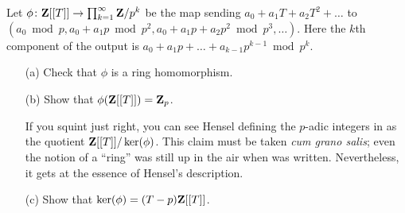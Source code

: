 

\begin{challenge} Let $\phi\colon \mathbf{Z}[[T]] \to \prod_{k=1}^{\infty} \mathbf{Z}/p^k$ be the map sending $a_0 + a_1 T + a_2 T^2 + \dots$ to $(a_0 \bmod{p}, a_0 + a_1 p \bmod{p^2}, a_0 + a_1 p + a_2 p^2 \bmod{p^3}, \dots)$. Here the $k$th component of the output is  $a_0 + a_1 p + \dots + a_{k-1} p^{k-1}\bmod p^k$. 
\vspace{-0.12in}
\begin{enumerate} 
    \item[(a)] Check that $\phi$ is a ring homomorphism.
    \item[(b)] Show that $\phi(\mathbf{Z}[[T]]) = \mathbf{Z}_p$. 

{\scriptsize If you squint just right, 
you can see Hensel defining the $p$-adic integers in \cite{hensel13} as the quotient $\mathbf{Z}[[T]]/\ker(\phi)$. This claim must be taken \textsl{cum grano salis}; even the notion of a ``ring''  was still up in the air when \cite{hensel13} was written. Nevertheless, it gets at the essence of Hensel's description.}

\item[(c)] Show that $\ker(\phi) = (T-p)\mathbf{Z}[[T]]$. 
\end{enumerate}
\end{challenge}


